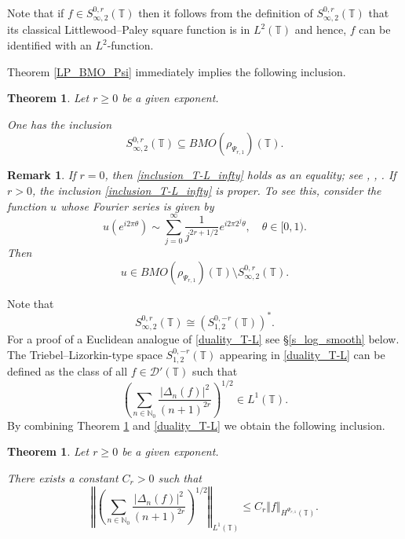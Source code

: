 \documentclass[a4paper, leqno, 10pt]{amsart}
\numberwithin{equation}{section}
\newtheorem{theo}[thm]{Theorem}
\newtheorem{rmk}[thm]{Remark}
\newcommand{\T}{\mathbb{T}}
\newcommand{\norm}[1]{\left\Vert#1\right\Vert}
\newcommand{\N}{\mathbb{N}}
\begin{document}
Note that if $f \in S^{0,r}_{\infty,2} (\T)$ then it follows from the definition of $S^{0,r}_{\infty,2} (\T)$ that its classical Littlewood--Paley square function is in $L^2 (\T)$ and hence, $f$ can be identified with an $L^2$-function. 

Theorem \ref{LP_BMO_Psi} immediately implies the following inclusion.

\begin{theo}\label{inclusion_infty}
Let $r \geq 0$ be a given exponent.

One has the inclusion
\begin{equation}\label{inclusion_T-L_infty}
S^{0,r}_{\infty,2} (\T) \subseteq BMO (\rho_{\Psi_{r,1}}) (\T). 
\end{equation}
\end{theo}

\begin{rmk}\label{proper_inclusion_infty}
If $r=0$, then \eqref{inclusion_T-L_infty} holds as an equality; see \cite{B}, \cite{FJ}, \cite{V-T}.
If $r >0$, the inclusion \eqref{inclusion_T-L_infty} is proper. To see this, consider the function $u$ whose Fourier series is given by
 \begin{equation}\label{BMO_psi_lac_ex}
u (e^{i 2\pi \theta}) \sim \sum_{j=0}^{\infty} \frac{1}{j^{2r +1/2}} e^{i 2\pi 2^j \theta}, \quad \theta \in [0,1).
\end{equation}
Then 
\[
u \in 
BMO (\rho_{\Psi_{r,1}}) (\T) \setminus S^{0,r}_{\infty,2} (\T) .
\]
\end{rmk}

Note that 
\begin{equation}\label{duality_T-L}
S^{0,r}_{\infty,2} (\T) \cong ( S^{0,-r}_{1,2} (\T) )^{\ast}.
\end{equation}
For a proof of a Euclidean analogue of \eqref{duality_T-L} see \S \ref{s_log_smooth} below. The Triebel--Lizorkin-type space $S^{0,-r}_{1,2} (\T)$ appearing in \eqref{duality_T-L}  can be defined as the class of all $f \in \mathcal{D}' (\T)$ such that 
\[
\left( \sum_{n \in \N_0} \frac{ \left| \Delta_n (f) \right|^2}{\left( n +1 \right)^{2r}} \right)^{1/2} \in L^1 (\T).
\]
By combining Theorem \ref{inclusion_infty} and \eqref{duality_T-L} we obtain the following inclusion.

\begin{theo}\label{LP_Psi_r_predual_Thm} Let $r \geq 0$ be a given exponent.

There exists a constant $C_r>0$ such that
\begin{equation}\label{LP_H_ineq_torus}
\norm{ \left( \sum_{n \in \N_0} \frac{ \left| \Delta_n (f) \right|^2}{\left( n +1 \right)^{2r}} \right)^{1/2}  }_{L^1 (\T)} \leq C_r \norm{ f }_{H^{\Psi_{r,1}} (\T)}. 
\end{equation}
\end{theo}
\end{document}
